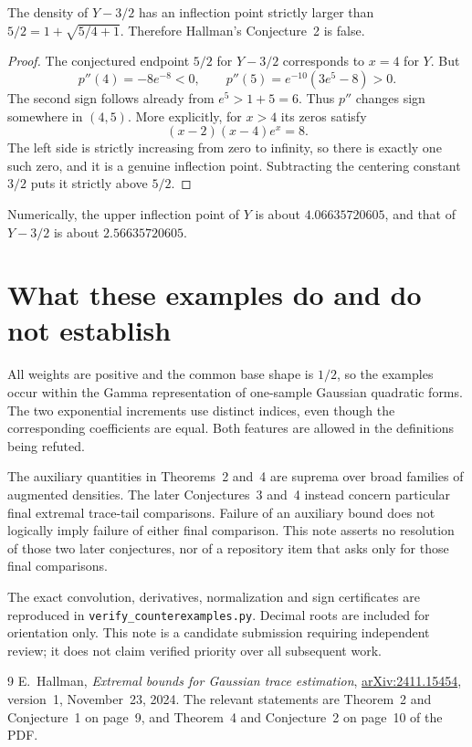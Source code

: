 \documentclass[11pt]{article}
\begin{document}
\begin{proposition}
The density of $Y-3/2$ has an inflection point strictly larger than $5/2=1+\sqrt{5/4+1}$. Therefore Hallman's Conjecture~2 is false.
\end{proposition}
\begin{proof}
The conjectured endpoint $5/2$ for $Y-3/2$ corresponds to $x=4$ for $Y$. But
\[
 p''(4)=-8e^{-8}<0,
 \qquad p''(5)=e^{-10}(3e^5-8)>0.
\]
The second sign follows already from $e^5>1+5=6$. Thus $p''$ changes sign somewhere in $(4,5)$. More explicitly, for $x>4$ its zeros satisfy
\[
 (x-2)(x-4)e^x=8.
\]
The left side is strictly increasing from zero to infinity, so there is exactly one such zero, and it is a genuine inflection point. Subtracting the centering constant $3/2$ puts it strictly above $5/2$.
\end{proof}
Numerically, the upper inflection point of $Y$ is about $4.06635720605$, and that of $Y-3/2$ is about $2.56635720605$.

\section{What these examples do and do not establish}
All weights are positive and the common base shape is $1/2$, so the examples occur within the Gamma representation of one-sample Gaussian quadratic forms. The two exponential increments use distinct indices, even though the corresponding coefficients are equal. Both features are allowed in the definitions being refuted.

The auxiliary quantities in Theorems~2 and~4 are suprema over broad families of augmented densities. The later Conjectures~3 and~4 instead concern particular final extremal trace-tail comparisons. Failure of an auxiliary bound does not logically imply failure of either final comparison. This note asserts no resolution of those two later conjectures, nor of a repository item that asks only for those final comparisons.

The exact convolution, derivatives, normalization and sign certificates are reproduced in \texttt{verify\_counterexamples.py}. Decimal roots are included for orientation only. This note is a candidate submission requiring independent review; it does not claim verified priority over all subsequent work.

\begin{thebibliography}{9}
E.~Hallman,
\emph{Extremal bounds for Gaussian trace estimation},
\href{https://arxiv.org/abs/2411.15454}{arXiv:2411.15454}, version~1, November~23, 2024.
The relevant statements are Theorem~2 and Conjecture~1 on page~9, and Theorem~4 and Conjecture~2 on page~10 of the PDF.
\end{thebibliography}
\end{document}
